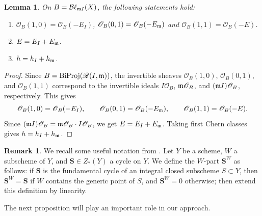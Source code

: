 \documentclass[a4paper, 11pt]{amsart}
\newcommand{\Bl}{{\mathcal{B}\ell}}
\newcommand{\mm}{{\normalfont\mathfrak{m}}}
\newcommand{\Rees}{\mathscr{R}}
\newcommand{\OO}{\mathscr{O}}
\newcommand{\biProj}{{\normalfont\text{BiProj}}}
\newtheorem{lemma}[lemma]{Lemma}
\theoremstyle{definition}
\newtheorem{remark}[remark]{Remark}
\begin{document}
	\begin{lemma}
		\label{prop:basic}
		On $B=\Bl_{\mm I}(X)$, the following statements hold:
		\begin{enumerate}[\rm(i)]
			\item $\OO_B(1,0) = \OO_B(-E_I)$, $\OO_B(0,1) = \OO_B(-E_\mm)$ and $\OO_B(1,1) = \OO_B(-E)$.
			\item $E = E_I + E_\mm$.
			\item $h = h_I + h_\mm$.
		\end{enumerate}
	\end{lemma}
	\begin{proof}
		Since $B=\biProj(\Rees(I,\mm))$, the invertible sheaves
		$\OO_B(1,0)$, $\OO_B(0,1)$, and $\OO_B(1,1)$ correspond to the invertible
		ideals $I\OO_B$, $\mm\OO_B$, and $(\mm I)\OO_B$, respectively. This gives
		$$
		\OO_B(1,0)=\OO_B(-E_I), \qquad \OO_B(0,1)=\OO_B(-E_\mm), \qquad
		\OO_B(1,1)=\OO_B(-E).
		$$
		Since $(\mm I)\OO_B=\mm\OO_B\cdot I\OO_B$, we get $E=E_I+E_\mm$. Taking first
		Chern classes gives $h=h_I+h_\mm$.
	\end{proof}
	
	\begin{remark}
		We recall some useful notation from \cite{KTBR,KTMixed}. Let $Y$ be a scheme, $W$ a subscheme of $Y$, and $\mathbf{S}\in Z_*(Y)$ a cycle on $Y$. We define the $W$-part $\mathbf{S}^W$ as follows: if $\mathbf{S}$ is the fundamental cycle of an integral closed subscheme $S\subset Y$, then $\mathbf{S}^W=\mathbf{S}$ if $W$ contains the generic point of $S$, and $\mathbf{S}^W=0$ otherwise; then extend this definition by linearity. 
	\end{remark}	
	
	
	The next proposition will play an important role in our approach. 
	
\end{document}
